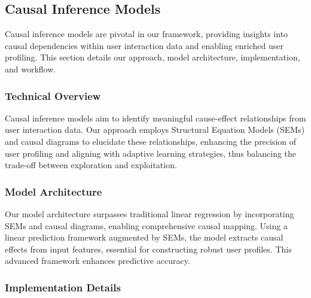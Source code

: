 \documentclass{article} %
\begin{document}
\subsection{Causal Inference Models}

Causal inference models are pivotal in our framework, providing insights into causal dependencies within user interaction data and enabling enriched user profiling. This section details our approach, model architecture, implementation, and workflow.

\subsubsection{Technical Overview}

Causal inference models aim to identify meaningful cause-effect relationships from user interaction data. Our approach employs Structural Equation Models (SEMs) and causal diagrams to elucidate these relationships, enhancing the precision of user profiling and aligning with adaptive learning strategies, thus balancing the trade-off between exploration and exploitation.

\subsubsection{Model Architecture}

Our model architecture surpasses traditional linear regression by incorporating SEMs and causal diagrams, enabling comprehensive causal mapping. Using a linear prediction framework augmented by SEMs, the model extracts causal effects from input features, essential for constructing robust user profiles. This advanced framework enhances predictive accuracy.

\subsubsection{Implementation Details}
\end{document}
